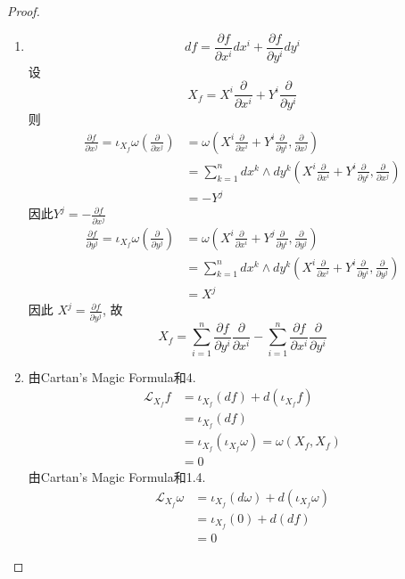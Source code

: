 \documentclass[../main.tex]{subfiles}
\begin{document}
\begin{proof}
\begin{enumerate}
    \item \[
    df= \frac{\partial f}{\partial x^{i}}dx^{i}+ \frac{\partial f}{\partial y^{i}}dy^{i}
    \] 设 \[
    X_{f}= X^{i}\frac{\partial }{\partial x^{i}}+ Y^{i}\frac{\partial }{\partial y^{i}}
    \]则 \[
   \begin{aligned}
  \frac{\partial f}{\partial x^{j}} =   \iota _{X_{f}} \omega \left( \frac{\partial }{\partial x^{j}} \right)&=  \omega \left( X^{i}\frac{\partial }{\partial x^{i}}+ Y^{i}\frac{\partial }{\partial y^{i}},\frac{\partial }{\partial x^{j}} \right)   \\ 
     &= \sum _{k= 1}^{n}dx^{k}\wedge dy^{k}\left( X^{i}\frac{\partial }{\partial x^{i}}+ Y^{i}\frac{\partial }{\partial y^{i}},\frac{\partial }{\partial x^{j}} \right)\\ 
      &=  -Y^{j}
   \end{aligned}
    \]因此\(  Y^{j}= -\frac{\partial f}{\partial x^{j}}  \) 
    \[
    \begin{aligned}
    \frac{\partial f}{\partial y^{j}}= \iota _{X_{f}} \omega \left( \frac{\partial }{\partial y^{j}} \right)  &=  \omega \left( X^{i}\frac{\partial }{\partial x^{i}}+ Y^{j}\frac{\partial }{\partial y^{i}},\frac{\partial }{\partial y^{j}} \right)\\ 
     &= \sum _{k= 1}^{n}d x^{k}\wedge dy^{k}\left( X^{i}\frac{\partial }{\partial x^{i}}+ Y^{i}\frac{\partial }{\partial y^{i}}, \frac{\partial }{\partial y^{j}} \right)\\ 
      &=  X^{j} 
    \end{aligned}
    \]因此 \(  X^{j}= \frac{\partial f}{\partial y^{j}}  \), 故 \[
    X_{f}= \sum _{i= 1}^{n}\frac{\partial f}{\partial y^{i}}\frac{\partial }{\partial x^{i}}-\sum _{i= 1}^{n}\frac{\partial f}{\partial x^{i}}\frac{\partial }{\partial y^{i}}
    \] 
    \item 由Cartan's Magic Formula和4. \[
   \begin{aligned}
    \mathcal{L}_{X_{f}}f &= \iota _{X_{f}}\left( df \right)+ d\left( \iota _{X_{f}}f \right)   \\ 
     &= \iota _{X_{f}}\left( df \right)\\ 
      &= \iota_{X_{f}}\left( \iota _{X_{f}} \omega  \right) =  \omega \left( X_{f},X_{f} \right)\\ 
       &= 0  
   \end{aligned}
    \] 由Cartan's Magic Formula和1.4.\[
    \begin{aligned}
    \mathcal{L}_{X_{f}} \omega &=  \iota _{X_{f}}\left( d \omega  \right)+ d\left( \iota _{X_{f}} \omega  \right)\\ 
     &= \iota _{X_{f}}\left( 0 \right)+  d\left( df \right)\\ 
      &= 0     
    \end{aligned}
    \]
   \end{enumerate}
   
\end{proof}
\end{document}
